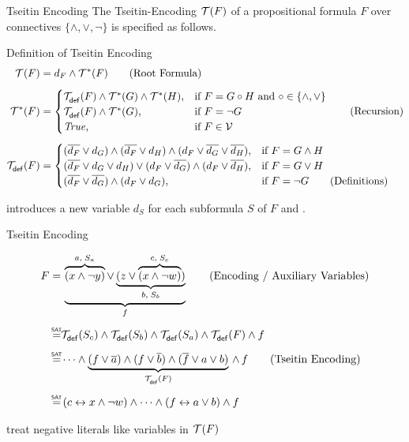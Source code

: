 \documentclass[t]{sdqbeamer}
\begin{document}
\begin{frame}{Tseitin Encoding}
The Tseitin-Encoding $\tseitin{F}$ of a propositional formula $F$ over connectives $\{ \land, \lor, \lnot \}$ is specified as follows.
\begin{block}{Definition of Tseitin Encoding}
	\vspace*{-3ex}
	\begin{align*}
	\tseitin{F} &= d_F \wedge \tseitinRec{F}{*} \tag{Root Formula}\\[1ex]
	\tseitinRec{F}{*} &= \begin{cases}
			\tseitinDef{F}{} \wedge \tseitinRec{G}{*} \wedge \tseitinRec{H}{*},
				& \text{if } F = G \circ H \text{ and } \circ \in \{\wedge, \vee\}\\
			\tseitinDef{F}{} \wedge \tseitinRec{G}{*}, & \text{if } F = \neg G\\
			\true, & \text{if } F \in \allvars
		\end{cases} \tag{Recursion}\\[1ex]
	\tseitinDef{F}{} &= \begin{cases}
			(\overline{d_F} \vee d_G) \wedge (\overline{d_F} \vee d_H) \land
				(d_F \lor \overline{d_G} \lor \overline{d_H}), & \text{if } F = G \wedge H\\
			(\overline{d_F} \vee d_G \vee d_H) \lor (d_F \vee \overline{d_G}) \wedge 
				(d_F \vee \overline{d_H}) , & \text{if } F = G \vee H\\
			(\overline{d_F} \lor \overline{d_G}) \land (d_F \lor d_G), & \text{if } F = \neg G \tag{Definitions}\\
			\end{cases}
	\end{align*}
\end{block}
 introduces a new variable $d_S$ for each subformula $S$ of $F$ and .
\end{frame}

\begin{frame}{Tseitin Encoding}
	\begin{example}
		\vspace*{-3ex}
		\begin{align*}
			F =&\, \underbrace{\overbrace{(x \land \lnot y)}^{a,\;S_a} \lor
			\underbrace{(z \lor \overbrace{(x \land \lnot w)}^{c,\;S_c})}_{b,\;S_b}}_f \tag{Encoding / Auxiliary Variables}\\[1ex]
			\sateq & \tseitinDef{S_c}{} \land \tseitinDef{S_b}{} \land \tseitinDef{S_a}{} \land \tseitinDef{F}{} \land f\\[1ex]
			\sateq & \dots \land \underbrace{(f \lor \overline{a}) \land (f \lor \overline{b}) \land (\overline{f} \lor a \lor b)}_{\tseitinDef{F}{}} \,\land\, f \tag{Tseitin Encoding} \\[1ex]
			\sateq &\, (c \leftrightarrow x \land \lnot w) \land \dots \land (f \leftrightarrow a \lor b) \land f
		\end{align*}
	\end{example}
	 treat negative literals like variables in $\tseitin{F}$
\end{frame}
\end{document}
